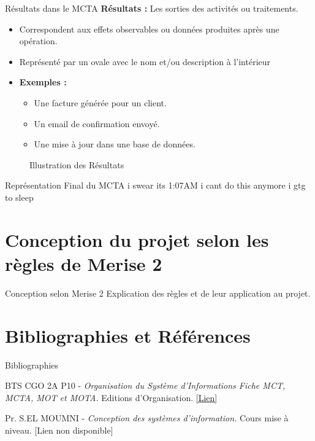 \documentclass{beamer}
\begin{document}
\begin{frame}{Résultats dans le MCTA}
    \textbf{Résultats :} Les sorties des activités ou traitements.
    \begin{itemize}
        \item Correspondent aux effets observables ou données produites après une opération.
        \item Représenté par un ovale avec le nom et/ou description à l'intérieur
        \item \textbf{Exemples :}
        \begin{itemize}
            \item Une facture générée pour un client.
            \item Un email de confirmation envoyé.
            \item Une mise à jour dans une base de données.
        \end{itemize}
    \end{itemize}
    \vspace{1em}
    \begin{figure}
        \centering
        \label{fig7}
        \caption{Illustration des Résultats}
    \end{figure}
\end{frame}

\begin{frame}{Représentation Final du MCTA}
i swear its 1:07AM i cant do this anymore i gtg to sleep
\end{frame}

\section{Conception du projet selon les règles de Merise 2}
\begin{frame}{Conception selon Merise 2}
    Explication des règles et de leur application au projet.
\end{frame}

\section{Bibliographies et Références}
\begin{frame}{Bibliographies}
\begin{thebibliography}{9}

BTS CGO 2A P10 -\textit{ Organisation du Système d’Informations Fiche MCT, MCTA, MOT et MOTA.} Editions d'Organisation. 
\href{https://example.com/merise}{[Lien]} 

Pr. S.EL MOUMNI -\textit{ Conception des systèmes d’information.} Cours mise à niveau. 
\alert{[Lien non disponible]}

\end{thebibliography}
\end{frame}
\end{document}
